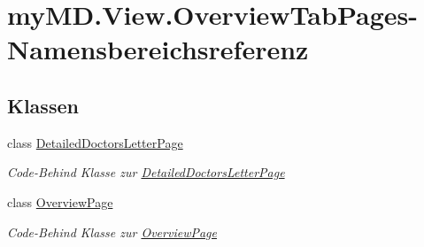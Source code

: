 \hypertarget{namespacemy_m_d_1_1_view_1_1_overview_tab_pages}{}\section{my\+M\+D.\+View.\+Overview\+Tab\+Pages-\/\+Namensbereichsreferenz}
\label{namespacemy_m_d_1_1_view_1_1_overview_tab_pages}
\subsection*{Klassen}
\begin{DoxyCompactItemize}
\item 
class \mbox{\hyperlink{classmy_m_d_1_1_view_1_1_overview_tab_pages_1_1_detailed_doctors_letter_page}{Detailed\+Doctors\+Letter\+Page}}
\begin{DoxyCompactList}\small\item\em Code-\/\+Behind Klasse zur \mbox{\hyperlink{classmy_m_d_1_1_view_1_1_overview_tab_pages_1_1_detailed_doctors_letter_page}{Detailed\+Doctors\+Letter\+Page}} \end{DoxyCompactList}\item 
class \mbox{\hyperlink{classmy_m_d_1_1_view_1_1_overview_tab_pages_1_1_overview_page}{Overview\+Page}}
\begin{DoxyCompactList}\small\item\em Code-\/\+Behind Klasse zur \mbox{\hyperlink{classmy_m_d_1_1_view_1_1_overview_tab_pages_1_1_overview_page}{Overview\+Page}} \end{DoxyCompactList}\end{DoxyCompactItemize}
